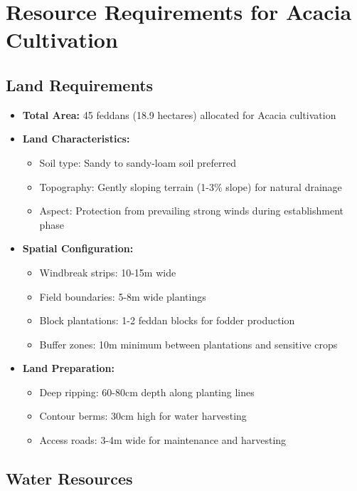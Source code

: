 \section{Resource Requirements for Acacia Cultivation}

\subsection{Land Requirements}

\begin{itemize}
    \item \textbf{Total Area:} 45 feddans (18.9 hectares) allocated for Acacia cultivation
    \item \textbf{Land Characteristics:}
    \begin{itemize}
        \item Soil type: Sandy to sandy-loam soil preferred
        \item Topography: Gently sloping terrain (1-3\% slope) for natural drainage
        \item Aspect: Protection from prevailing strong winds during establishment phase
    \end{itemize}
    \item \textbf{Spatial Configuration:}
    \begin{itemize}
        \item Windbreak strips: 10-15m wide
        \item Field boundaries: 5-8m wide plantings
        \item Block plantations: 1-2 feddan blocks for fodder production
        \item Buffer zones: 10m minimum between plantations and sensitive crops
    \end{itemize}
    \item \textbf{Land Preparation:}
    \begin{itemize}
        \item Deep ripping: 60-80cm depth along planting lines
        \item Contour berms: 30cm high for water harvesting
        \item Access roads: 3-4m wide for maintenance and harvesting
    \end{itemize}
\end{itemize}

\subsection{Water Resources}

